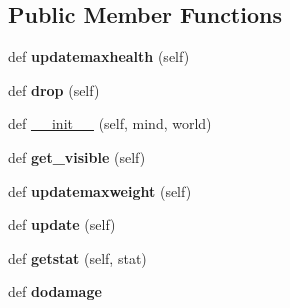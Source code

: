 \subsection*{Public Member Functions}
\begin{DoxyCompactItemize}
\item 
\hypertarget{classmonster__body_1_1_human_body_a8ca8658e36fca285a74f7ba34788b312}{}def {\bfseries updatemaxhealth} (self)\label{classmonster__body_1_1_human_body_a8ca8658e36fca285a74f7ba34788b312}

\item 
\hypertarget{classmonster__body_1_1_human_body_ae89d3384982af338f525dd7e81a19f69}{}def {\bfseries drop} (self)\label{classmonster__body_1_1_human_body_ae89d3384982af338f525dd7e81a19f69}

\item 
def \hyperlink{classmonster__body_1_1_human_body_a526ef6d5fef3494a73038534270ab3ec}{\+\_\+\+\_\+init\+\_\+\+\_\+} (self, mind, world)
\item 
\hypertarget{classmonster__body_1_1_human_body_a1905ab8ebc69b762d8f505b7a0cee7e2}{}def {\bfseries get\+\_\+visible} (self)\label{classmonster__body_1_1_human_body_a1905ab8ebc69b762d8f505b7a0cee7e2}

\item 
\hypertarget{classmonster__body_1_1_human_body_a7ff069898edeee2c8b1aef3abe82c9fc}{}def {\bfseries updatemaxweight} (self)\label{classmonster__body_1_1_human_body_a7ff069898edeee2c8b1aef3abe82c9fc}

\item 
\hypertarget{classmonster__body_1_1_human_body_a4d1d71a2e5e70400bebc0891a366aae3}{}def {\bfseries update} (self)\label{classmonster__body_1_1_human_body_a4d1d71a2e5e70400bebc0891a366aae3}

\item 
\hypertarget{classmonster__body_1_1_human_body_af57f3f8fdcafd9fb1d8c9616239d52fe}{}def {\bfseries getstat} (self, stat)\label{classmonster__body_1_1_human_body_af57f3f8fdcafd9fb1d8c9616239d52fe}

\item 
\hypertarget{classmonster__body_1_1_human_body_a7276cbe9d380ad95d80be70821a1b883}{}def {\bfseries dodamage}\label{classmonster__body_1_1_human_body_a7276cbe9d380ad95d80be70821a1b883}

\end{DoxyCompactItemize}

